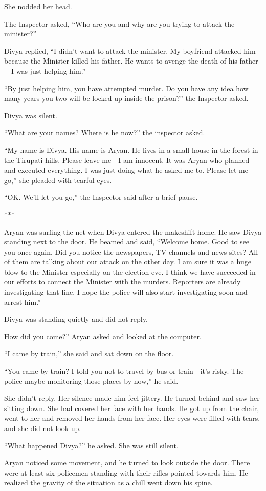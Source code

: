 She nodded her head.

The Inspector asked, “Who are you and why are you trying to attack the
minister?”

Divya replied, “I didn't want to attack the minister. My boyfriend attacked him
because the Minister killed his father. He wants to avenge the death of his
father—I was just helping him.”

“By just helping him, you have attempted murder. Do you have any idea how many
years you two will be locked up inside the prison?” the Inspector asked.

Divya was silent.

“What are your names? Where is he now?” the inspector asked.

“My name is Divya. His name is Aryan. He lives in a small house in the forest in
the Tirupati hills. Please leave me—I am innocent. It was Aryan who planned
and executed everything. I was just doing what he asked me to. Please let me
go,” she pleaded with tearful eyes.

“OK. We'll let you go,” the Inspector said after a brief pause.

***

Aryan was surfing the net when Divya entered the makeshift home. He saw Divya
standing next to the door. He beamed and said, “Welcome home. Good to see you
once again. Did you notice the newspapers, TV channels and news sites? All of
them are talking about our attack on the other day. I am sure it was a huge blow
to the Minister especially on the election eve. I think we have succeeded in our
efforts to connect the Minister with the murders. Reporters are already
investigating that line. I hope the police will also start investigating soon
and arrest him.”

Divya was standing quietly and did not reply.

How did you come?” Aryan asked and looked at the computer.

“I came by train,” she said and sat down on the floor.

“You came by train? I told you not to travel by bus or train—it's risky. The
police maybe monitoring those places by now,” he said.

She didn't reply. Her silence made him feel jittery. He turned behind and saw
her sitting down. She had covered her face with her hands. He got up from the
chair, went to her and removed her hands from her face. Her eyes were filled
with tears, and she did not look up.

“What happened Divya?” he asked. She was still silent.

Aryan noticed some movement, and he turned to look outside the door. There were
at least six policemen standing with their rifles pointed towards him. He
realized the gravity of the situation as a chill went down his spine.
